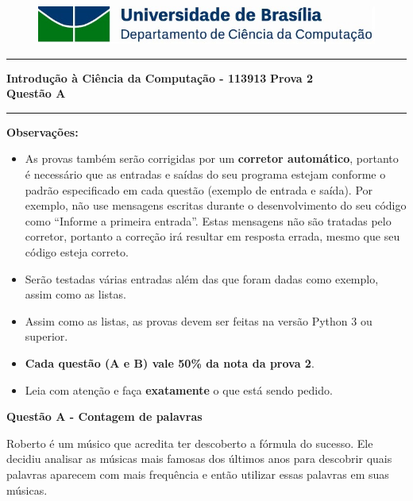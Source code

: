 \documentclass[a4paper, 12pt]{article}
\begin{document}
\begin{figure}[H]
	\includegraphics[scale=0.9]{UnB_CiC_Logo.jpg}
\end{figure}
\noindent\rule{\textwidth}{0.4pt}
\begin{center}
	\textbf{{\Large Introdução à Ciência da Computação - 113913}} \newline \newline
	\textbf{{\large Prova 2} \\
	\vspace{9pt}
	{\large Questão A}} \\
	\noindent\rule{\textwidth}{0.4pt}
	\newline
\end{center}

\textbf{{\large Observações:}}
\begin{itemize}
	\item As provas também serão corrigidas por um \textbf{corretor automático}, portanto é necessário que as entradas e saídas do seu programa estejam conforme o padrão especificado em cada questão (exemplo de entrada e saída). Por exemplo, não use mensagens escritas durante o desenvolvimento do seu código como “Informe a primeira entrada”. Estas mensagens não são tratadas pelo corretor, portanto a correção irá resultar em resposta errada, mesmo que seu código esteja correto.
	\item Serão testadas várias entradas além das que foram dadas como exemplo, assim como as listas.
	\item Assim como as listas, as provas devem ser feitas na versão Python 3 ou superior.
	\item \textbf{Cada questão (A e B) vale 50\% da nota da prova 2}.
	\item Leia com atenção e faça \textbf{exatamente} o que está sendo pedido.
\end{itemize}
\newpage %
\begin{center}
\textbf{{\Large Questão A - Contagem de palavras}}
\end{center}
\vspace{5pt}

Roberto é um músico que acredita ter descoberto a fórmula do sucesso. Ele decidiu analisar as músicas mais famosas dos últimos anos para descobrir quais palavras aparecem com mais frequência e então utilizar essas palavras em suas músicas.
\end{document}
